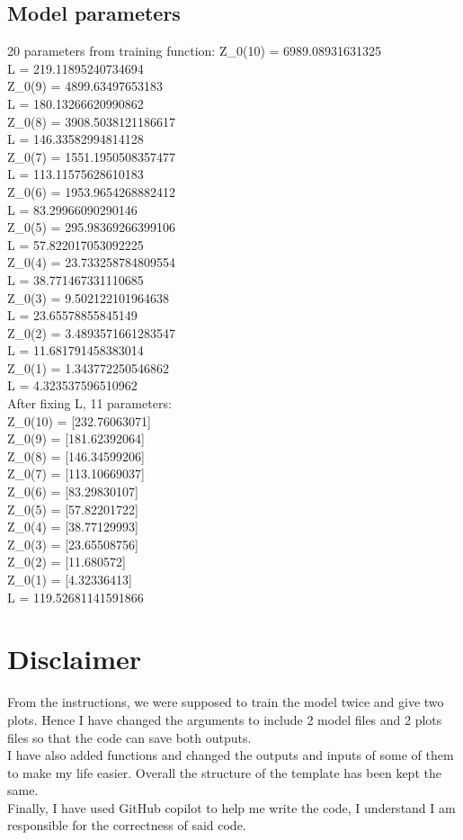 \documentclass[12pt]{article}
\begin{document}
\subsection{Model parameters}
20 parameters from training function:
Z\_0(10) = 6989.08931631325\\
L = 219.11895240734694\\
Z\_0(9) = 4899.63497653183\\
L = 180.13266620990862\\
Z\_0(8) = 3908.5038121186617\\
L = 146.33582994814128\\
Z\_0(7) = 1551.1950508357477\\
L = 113.11575628610183\\
Z\_0(6) = 1953.9654268882412\\
L = 83.29966090290146\\
Z\_0(5) = 295.98369266399106\\
L = 57.822017053092225\\
Z\_0(4) = 23.733258784809554\\
L = 38.771467331110685\\
Z\_0(3) = 9.502122101964638\\
L = 23.65578855845149\\
Z\_0(2) = 3.4893571661283547\\
L = 11.681791458383014\\
Z\_0(1) = 1.343772250546862\\
L = 4.323537596510962\\
After fixing L, 11 parameters:\\
Z\_0(10) = [232.76063071]\\
Z\_0(9) = [181.62392064]\\
Z\_0(8) = [146.34599206]\\
Z\_0(7) = [113.10669037]\\
Z\_0(6) = [83.29830107]\\
Z\_0(5) = [57.82201722]\\
Z\_0(4) = [38.77129993]\\
Z\_0(3) = [23.65508756]\\
Z\_0(2) = [11.680572]\\
Z\_0(1) = [4.32336413]\\
L = 119.52681141591866

\section{Disclaimer}
From the instructions, we were supposed to train the model twice and give two plots. Hence I have changed the arguments to include 2 model files and 2 plots files so that the code can save both outputs.\\
I have also added functions and changed the outputs and inputs of some of them to make my life easier. Overall the structure of the template has been kept the same.\\
Finally, I have used GitHub copilot to help me write the code, I understand I am responsible for the correctness of said code.
\end{document}
